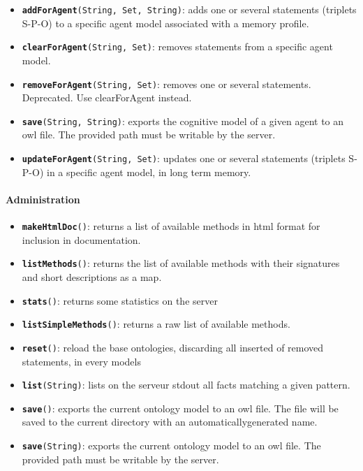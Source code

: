 \begin{itemize}
    \item {\tt {\bf addForAgent}(String, Set, String)}: adds one or several
    statements (triplets S-P-O) to a specific agent model associated with a
    memory profile.

    \item {\tt {\bf clearForAgent}(String, Set)}: removes statements from a
    specific agent model.

    \item {\tt {\bf removeForAgent}(String, Set)}: removes one or several
    statements. Deprecated. Use clearForAgent instead.

    \item {\tt {\bf save}(String, String)}: exports the cognitive model of a
    given agent to an owl file. The provided path must be writable by the
    server.

    \item {\tt {\bf updateForAgent}(String, Set)}: updates one or several
    statements (triplets S-P-O) in a specific agent model, in long term memory.
\end{itemize}


\paragraph{Administration}
\begin{itemize}

    \item {\tt {\bf makeHtmlDoc}()}: returns a list of available methods in
    html format for inclusion in documentation.

    \item {\tt {\bf listMethods}()}: returns the list of available methods with
    their signatures and short descriptions as a map.

    \item {\tt {\bf stats}()}: returns some statistics on the server

    \item {\tt {\bf listSimpleMethods}()}: returns a raw list of available
    methods.

    \item {\tt {\bf reset}()}: reload the base ontologies, discarding all
    inserted of removed statements, in every models

    \item {\tt {\bf list}(String)}: lists on the serveur stdout all facts
    matching a given pattern.

    \item {\tt {\bf save}()}: exports the current ontology model to an owl
    file. The file will be saved to the current directory with an
    automaticallygenerated name.

    \item {\tt {\bf save}(String)}: exports the current ontology model to an
    owl file. The provided path must be writable by the server.
\end{itemize}

